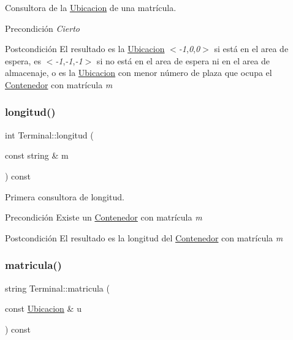 Consultora de la \hyperlink{class_ubicacion}{Ubicacion} de una matrícula. 

\begin{DoxyPrecond}{Precondición}
{\itshape Cierto} 
\end{DoxyPrecond}
\begin{DoxyPostcond}{Postcondición}
El resultado es la \hyperlink{class_ubicacion}{Ubicacion} $<${\itshape -\/1},{\itshape 0},{\itshape 0}$>$ si está en el area de espera, es $<${\itshape -\/1},{\itshape -\/1},{\itshape -\/1}$>$ si no está en el area de espera ni en el area de almacenaje, o es la \hyperlink{class_ubicacion}{Ubicacion} con menor número de plaza que ocupa el \hyperlink{class_contenedor}{Contenedor} con matrícula {\itshape m} 
\end{DoxyPostcond}
\mbox{\label{class_terminal_afc6d0f22bcc642c6ac4355e0b02a7d79}} 
\subsubsection{\texorpdfstring{longitud()}{longitud()}}
{\footnotesize\ttfamily int Terminal\+::longitud (\begin{DoxyParamCaption}\item[{const string \&}]{m }\end{DoxyParamCaption}) const}



Primera consultora de longitud. 

\begin{DoxyPrecond}{Precondición}
Existe un \hyperlink{class_contenedor}{Contenedor} con matrícula {\itshape m} 
\end{DoxyPrecond}
\begin{DoxyPostcond}{Postcondición}
El resultado es la longitud del \hyperlink{class_contenedor}{Contenedor} con matrícula {\itshape m} 
\end{DoxyPostcond}
\mbox{\label{class_terminal_a674811a7b56f57ff5b447d10565e923b}} 
\subsubsection{\texorpdfstring{matricula()}{matricula()}}
{\footnotesize\ttfamily string Terminal\+::matricula (\begin{DoxyParamCaption}\item[{const \hyperlink{class_ubicacion}{Ubicacion} \&}]{u }\end{DoxyParamCaption}) const}



